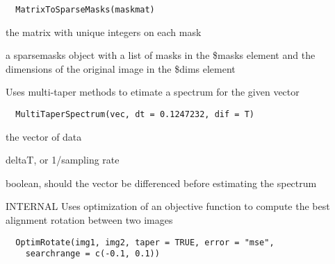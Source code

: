 \documentclass[a4paper]{book}
\begin{document}
\begin{Usage}
\begin{verbatim}
  MatrixToSparseMasks(maskmat)
\end{verbatim}
\end{Usage}
%
\begin{Arguments}
\begin{ldescription}
\item[\code{maskmat}] the matrix with unique integers on each
mask

\item[\code{return}] a sparsemasks object with a list of masks
in the \$masks element and the dimensions of the original
image in the \$dims element
\end{ldescription}
\end{Arguments}
%
\begin{Description}\relax
Uses multi-taper methods to etimate a spectrum for the
given vector
\end{Description}
%
\begin{Usage}
\begin{verbatim}
  MultiTaperSpectrum(vec, dt = 0.1247232, dif = T)
\end{verbatim}
\end{Usage}
%
\begin{Arguments}
\begin{ldescription}
\item[\code{vec}] the vector of data

\item[\code{dt}] deltaT, or 1/sampling rate

\item[\code{dif}] boolean, should the vector be differenced
before estimating the spectrum
\end{ldescription}
\end{Arguments}
%
\begin{Description}\relax
INTERNAL Uses optimization of an objective function to
compute the best alignment rotation between two images
\end{Description}
%
\begin{Usage}
\begin{verbatim}
  OptimRotate(img1, img2, taper = TRUE, error = "mse",
    searchrange = c(-0.1, 0.1))
\end{verbatim}
\end{Usage}
\end{document}
